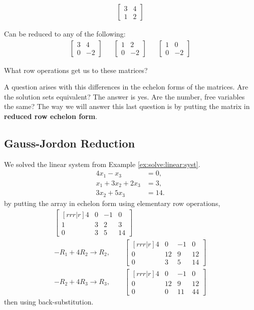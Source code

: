 %
\begin{align*}
\begin{bmatrix}
3 & 4 \\
1 & 2
\end{bmatrix}
\end{align*}

Can be reduced to any of the following:
%
\begin{align*}
\begin{bmatrix}
3 & 4 \\
0 & -2
\end{bmatrix} &&
\begin{bmatrix}
1 & 2 \\
0 & -2
\end{bmatrix} &&
\begin{bmatrix}
1 & 0 \\
0 & -2
\end{bmatrix}
\end{align*}

What row operations get us to these matrices?

A question arises with this differences in the echelon forms of the matrices.  Are the solution sets equivalent?  The answer is yes.  Are the number, free variables the same?    The way we will answer this last question is by putting the matrix in \textbf{reduced row echelon form}.

\subsection{Gauss-Jordon Reduction}


We solved the linear system from Example \ref{ex:solve:linear:syst}.
%
\begin{align*}
4x_1 - x_3 & = 0, \\
x_1+3x_2 +2x_3 & = 3, \\
3x_2 + 5x_3 & = 14.
\end{align*}
%
by putting the array in echelon form using elementary row operations,
\begin{align*}
\begin{bmatrix}[rrr|r]
4 & 0 & -1 & 0 \\
1 & 3 & 2 & 3 \\
0 & 3 & 5 & 14
\end{bmatrix} \\
-R_1 + 4R_2 \rightarrow R_2,  \qquad
\begin{bmatrix}[rrr|r]
4 & 0 & -1 & 0 \\
0 & 12 & 9 & 12 \\
0 & 3 & 5 & 14
\end{bmatrix} \\
-R_2 + 4R_3 \rightarrow R_3, \qquad
\begin{bmatrix}[rrr|r]
4 & 0 & -1 & 0 \\
0 & 12 & 9 & 12 \\
0 & 0 & 11 & 44
\end{bmatrix}
\end{align*}
then using back-substitution.


